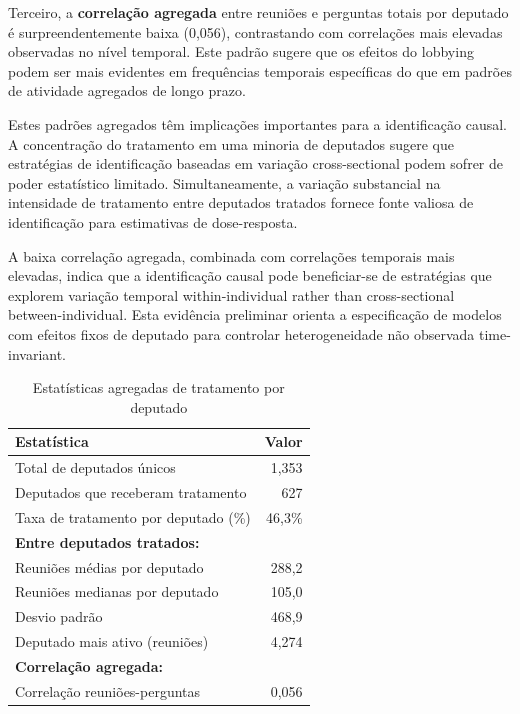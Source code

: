 Terceiro, a \textbf{correlação agregada} entre reuniões e perguntas totais por deputado é surpreendentemente baixa (0,056), contrastando com correlações mais elevadas observadas no nível temporal. Este padrão sugere que os efeitos do lobbying podem ser mais evidentes em frequências temporais específicas do que em padrões de atividade agregados de longo prazo.


Estes padrões agregados têm implicações importantes para a identificação causal. A concentração do tratamento em uma minoria de deputados sugere que estratégias de identificação baseadas em variação cross-sectional podem sofrer de poder estatístico limitado. Simultaneamente, a variação substancial na intensidade de tratamento entre deputados tratados fornece fonte valiosa de identificação para estimativas de dose-resposta.

A baixa correlação agregada, combinada com correlações temporais mais elevadas, indica que a identificação causal pode beneficiar-se de estratégias que explorem variação temporal within-individual rather than cross-sectional between-individual. Esta evidência preliminar orienta a especificação de modelos com efeitos fixos de deputado para controlar heterogeneidade não observada time-invariant.

\begin{table}[htbp]
\centering
\caption{Estatísticas agregadas de tratamento por deputado}
\label{tab:mep_treatment_stats}
\begin{tabular}{lr}
\toprule
\textbf{Estatística} & \textbf{Valor} \\
\midrule
Total de deputados únicos & 1{,}353 \\
Deputados que receberam tratamento & 627 \\
Taxa de tratamento por deputado (\%) & 46{,}3\% \\
\midrule
\textbf{Entre deputados tratados:} & \\
Reuniões médias por deputado & 288{,}2 \\
Reuniões medianas por deputado & 105{,}0 \\
Desvio padrão & 468{,}9 \\
Deputado mais ativo (reuniões) & 4{,}274 \\
\midrule
\textbf{Correlação agregada:} & \\
Correlação reuniões-perguntas & 0{,}056 \\
\bottomrule
\end{tabular}
\end{table}

